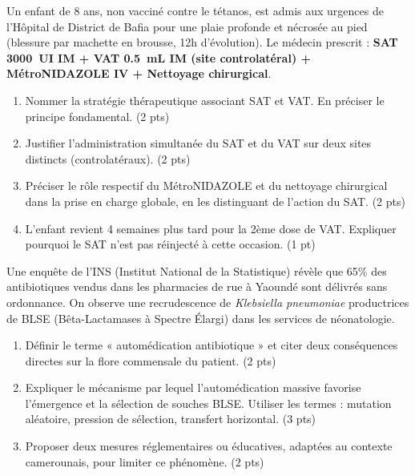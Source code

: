 \documentclass[11pt]{article}
\begin{document}
\begin{exercice}
Un enfant de 8 ans, non vacciné contre le tétanos, est admis aux urgences de l'Hôpital de District de Bafia pour une plaie profonde et nécrosée au pied (blessure par machette en brousse, 12h d'évolution). Le médecin prescrit : \textbf{SAT \SI{3000}{UI} IM + VAT \SI{0,5}{mL} IM (site controlatéral) + MétroNIDAZOLE IV + Nettoyage chirurgical}.
\begin{enumerate}
    \item Nommer la stratégie thérapeutique associant SAT et VAT. En préciser le principe fondamental. (2 pts)
    \item Justifier l'administration simultanée du SAT et du VAT sur deux sites distincts (controlatéraux). (2 pts)
    \item Préciser le rôle respectif du MétroNIDAZOLE et du nettoyage chirurgical dans la prise en charge globale, en les distinguant de l'action du SAT. (2 pts)
    \item L'enfant revient 4 semaines plus tard pour la 2ème dose de VAT. Expliquer pourquoi le SAT n'est pas réinjecté à cette occasion. (1 pt)
\end{enumerate}
\end{exercice}

\begin{exercice}
Une enquête de l'INS (Institut National de la Statistique) révèle que 65\% des antibiotiques vendus dans les pharmacies de rue à Yaoundé sont délivrés sans ordonnance. On observe une recrudescence de \textit{Klebsiella pneumoniae} productrices de BLSE (Bêta-Lactamases à Spectre Élargi) dans les services de néonatologie.
\begin{enumerate}
    \item Définir le terme « automédication antibiotique » et citer deux conséquences directes sur la flore commensale du patient. (2 pts)
    \item Expliquer le mécanisme par lequel l'automédication massive favorise l'émergence et la sélection de souches BLSE. Utiliser les termes : mutation aléatoire, pression de sélection, transfert horizontal. (3 pts)
    \item Proposer deux mesures réglementaires ou éducatives, adaptées au contexte camerounais, pour limiter ce phénomène. (2 pts)
\end{enumerate}
\end{exercice}
\end{document}
